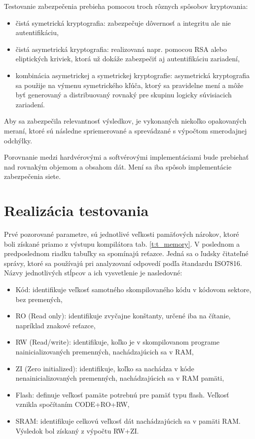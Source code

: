 \documentclass[12pt,a4paper,oneside,openright]{report}
\begin{document}
Testovanie zabezpečenia prebieha pomocou troch rôznych spôsobov kryptovania:
\singlespacing
\begin{itemize}
	\item čistá symetrická kryptografia: zabezpečuje dôvernosť a integritu ale nie autentifikáciu,
	\item čistá asymetrická kryptografia: realizovaná napr. pomocou RSA alebo eliptických kriviek, ktorá už dokáže zabezpečiť aj autentifikáciu zariadení,
	\item kombinácia asymetrickej a symetrickej kryptografie: asymetrická kryptografia sa použije na výmenu symetrického kľúča, ktorý sa pravidelne mení a môže byť generovaný a distribuovaný rovnaký pre skupinu logicky súvisiacich zariadení.
\end{itemize}
\onehalfspacing


Aby sa zabezpečila relevantnosť výsledkov, je vykonaných niekoľko opakovaných meraní, ktoré sú následne spriemerované a sprevádzané s výpočtom smerodajnej odchýlky.

Porovnanie medzi hardvérovými a softvérovými implementáciami bude prebiehať nad rovnakým objemom a obsahom dát. Mení sa iba spôsob implementácie zabezpečenia siete.

\section{Realizácia testovania}

Prvé pozorované parametre, sú jednotlivé veľkosti pamäťových nárokov, ktoré boli získané priamo z výstupu kompilátora tab. \ref{t:t_memory}. V poslednom a predposlednom riadku tabuľky sa spomínajú reťazce. Jedná sa o ľudsky čitateľné správy, ktoré sa používajú pri analyzovaní odpovedí podľa štandardu ISO7816. Názvy jednotlivých stĺpcov a ich vysvetlenie je nasledovné:
\begin{itemize}
	\item Kód: identifikuje veľkosť samotného skompilovaného kódu v kódovom sektore, bez premených,
	\item RO (Read only): identifikuje zvyčajne konštanty, určené iba na čítanie, napríklad znakové reťazce,
	\item RW (Read/write): identifikuje, koľko je v skompilovanom programe nainicializovaných premenných, nachádzajúcich sa v RAM,
	\item ZI (Zero initialized): identifikuje, koľko sa nachádza v kóde nenainicializovaných premenných, nachádzajúcich sa v RAM pamäti,
	\item Flash: definuje veľkosť pamäte potrebnú pre pamäť typu flash. Veľkosť vznikla spočítaním CODE+RO+RW,
	\item SRAM: identifikuje celkovú veľkosť dát nachádzajúcich sa v pamäti RAM. Výsledok bol získaný z výpočtu RW+ZI.
\end{itemize}
\onehalfspacing
\end{document}
